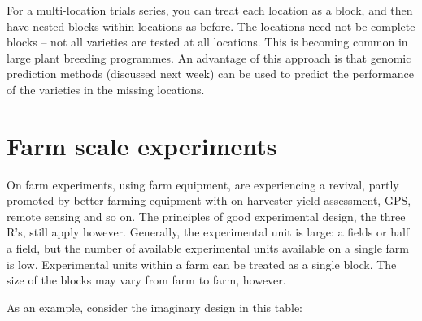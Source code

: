 \documentclass[
]{book}
\makeatletter
\newenvironment{kframe}{%
\medskip{}
\setlength{\fboxsep}{.8em}
 \def\at@end@of@kframe{}%
 \ifinner\ifhmode%
  \def\at@end@of@kframe{\end{minipage}}%
  \begin{minipage}{\columnwidth}%
 \fi\fi%
 \def\FrameCommand##1{\hskip\@totalleftmargin \hskip-\fboxsep
 \colorbox{shadecolor}{##1}\hskip-\fboxsep
     \hskip-\linewidth \hskip-\@totalleftmargin \hskip\columnwidth}%
 \MakeFramed {\advance\hsize-\width
   \@totalleftmargin\z@ \linewidth\hsize
   \@setminipage}}%
 {\par\unskip\endMakeFramed%
 \at@end@of@kframe}
\newenvironment{rmdblock}[1]
  {
  \begin{itemize}
  \renewcommand{\labelitemi}{
    \raisebox{-.7\height}[0pt][0pt]{
      {\setkeys{Gin}{width=3em,keepaspectratio}\texttt{[image: images/\#1]}}
    }
  }
  \setlength{\fboxsep}{1em}
  \begin{kframe}
  \item
  }
  {
  \end{kframe}
  \end{itemize}
  }
\newenvironment{rmdnote}
  {\begin{rmdblock}{note}}
  {\end{rmdblock}}
\makeatother
\begin{document}
\begin{rmdnote}
For a multi-location trials series, you can treat each location as a block, and then have nested blocks within locations as before. The locations need not be complete blocks -- not all varieties are tested at all locations. This is becoming common in large plant breeding programmes. An advantage of this approach is that genomic prediction methods (discussed next week) can be used to predict the performance of the varieties in the missing locations.
\end{rmdnote}

\hypertarget{farm-scale-experiments}{%
\section{Farm scale experiments}\label{farm-scale-experiments}}

On farm experiments, using farm equipment, are experiencing a revival, partly promoted by better farming equipment with on-harvester yield assessment, GPS, remote sensing and so on. The principles of good experimental design, the three R's, still apply however. Generally, the experimental unit is large: a fields or half a field, but the number of available experimental units available on a single farm is low. Experimental units within a farm can be treated as a single block. The size of the blocks may vary from farm to farm, however.

As an example, consider the imaginary design in this table:
\end{document}
